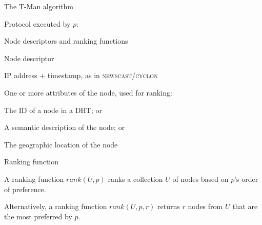 \begin{frame}[shrink=5]{The T-Man algorithm}
	
\begin{Procedure}
\caption{Protocol executed by $p$:}

\BlankLine
{}
\BlankLine
{}
\BlankLine
{}
\end{Procedure}

\end{frame}

\begin{frame}{Node descriptors and ranking functions}
	
\begin{block}{Node descriptor}
\BI
\item IP address + timestamp, as in \textsc{newscast}/\textsc{cyclon}
\item One or more attributes of the node, used for ranking:
	\BI
	\item The ID of a node in a DHT; or
	\item A semantic description of the node; or
	\item The geographic location of the node
	\EI
\EI
\end{block}

\begin{block}{Ranking function}
\BI
\item A \alert{ranking function} $\mathit{rank}(U,p)$ ranks a collection $U$ of nodes based
on $p$'s order of preference.
\item Alternatively, a \alert{ranking function} $\mathit{rank}(U,p,r)$ returns $r$ nodes from
$U$ that are the most preferred by $p$.
\EI
\end{block}

\end{frame}

